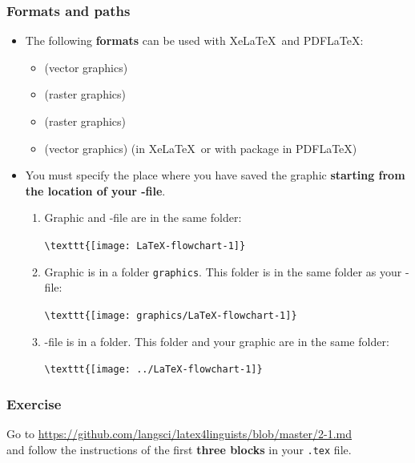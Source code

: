 \begin{frame}[fragile]
\frametitle{Formats and paths}

\begin{itemize}
\item The following \textbf{formats} can be used with Xe\LaTeX\ and PDF\LaTeX :
	\begin{itemize}
	\item {} (vector graphics)
	\item {} (raster graphics)
	\item {} (raster graphics)
	\item {} (vector graphics) (in Xe\LaTeX\ or with  package in PDF\LaTeX )
	\end{itemize}

\pause 

\item You must specify the place where you have saved the graphic \textbf{starting from the location of your -file}.

\begin{enumerate}
	\item Graphic and  -file are in the same folder:	
	
	\lstinline|\texttt{[image: LaTeX-flowchart-1]}|
	
	\item Graphic is in a folder \texttt{graphics}. This folder is in the same folder as your  -file: 
	
	\lstinline|\texttt{[image: graphics/LaTeX-flowchart-1]}|
	
	\item {}-file is in a folder. This folder and your graphic are in the same folder: 
	
	\lstinline|\texttt{[image: ../LaTeX-flowchart-1]}|
\end{enumerate}

\end{itemize}

\end{frame}


\begin{frame}[fragile]
\frametitle{Exercise}

Go to \url{https://github.com/langsci/latex4linguists/blob/master/2-1.md}\\
and follow the instructions of the first \textbf{three blocks} in your \texttt{.tex} file.

\end{frame}


